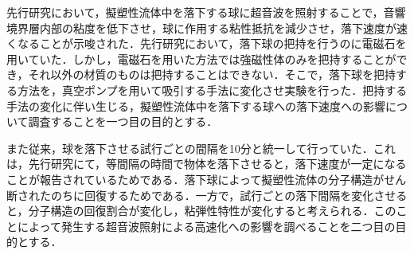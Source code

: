 先行研究\cite{ref:8}において，擬塑性流体中を落下する球に超音波を照射することで，音響境界層内部の粘度を低下させ，球に作用する粘性抵抗を減少させ，落下速度が速くなることが示唆された．先行研究\cite{ref:8}において，落下球の把持を行うのに電磁石を用いていた．しかし，電磁石を用いた方法では強磁性体のみを把持することができ，それ以外の材質のものは把持することはできない．そこで，落下球を把持する方法を，真空ポンプを用いて吸引する手法に変化させ実験を行った．把持する手法の変化に伴い生じる，擬塑性流体中を落下する球への落下速度への影響について調査することを一つ目の目的とする．

また従来，球を落下させる試行ごとの間隔を10分と統一して行っていた．これは，先行研究\cite{ref:8-5}にて，等間隔の時間で物体を落下させると，落下速度が一定になることが報告されているためである．落下球によって擬塑性流体の分子構造がせん断されたのちに回復するためである．一方で，試行ごとの落下間隔を変化させると，分子構造の回復割合が変化し，粘弾性特性が変化すると考えられる．このことによって発生する超音波照射による高速化への影響を調べることを二つ目の目的とする．
